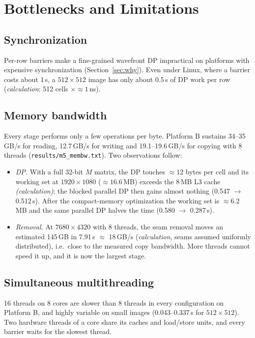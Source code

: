 \documentclass[11pt,a4paper]{article}
\newcommand{\us}{\,\textmu s}
\newcommand{\calc}{\emph{(calculation)}}
\begin{document}
\section{Bottlenecks and Limitations}
\label{sec:bottle}

\subsection{Synchronization}
Per-row barriers make a fine-grained wavefront DP impractical on platforms with expensive synchronization
(Section~\ref{sec:why}). Even under Linux, where a barrier costs about 1\us, a $512\times512$ image has only
about 0.5\us{} of DP work per row (\emph{calculation}: 512 cells $\times\approx1$\,ns).

\subsection{Memory bandwidth}
\label{sec:membw}
Every stage performs only a few operations per byte. Platform B sustains 34--35\,GB/s for reading,
12.7\,GB/s for writing and 19.1--19.6\,GB/s for copying with 8 threads (\texttt{results/m5\_membw.txt}).
Two observations follow:
\begin{itemize}
  \item \emph{DP.} With a full 32-bit $M$ matrix, the DP touches $\approx12$ bytes per cell and its working
    set at $1920\times1080$ ($\approx16.6$\,MB) exceeds the 8\,MB L3 cache \calc; the blocked parallel DP
    then gains almost nothing (0.547 $\to$ 0.512\,s). After the compact-memory optimization the working
    set is $\approx6.2$\,MB and the same parallel DP halves the time (0.580 $\to$ 0.287\,s).
  \item \emph{Removal.} At $7680\times4320$ with 8 threads, the seam removal moves an estimated 145\,GB in
    7.91\,s $\approx$ 18\,GB/s (\emph{calculation}, seams assumed uniformly distributed), i.e.\ close to the
    measured copy bandwidth. More threads cannot speed it up, and it is now the largest stage.
\end{itemize}

\subsection{Simultaneous multithreading}
16 threads on 8 cores are slower than 8 threads in every configuration on Platform B, and highly variable
on small images (0.043--0.337\,s for $512\times512$). Two hardware threads of a core share its caches and
load/store units, and every barrier waits for the slowest thread.
\end{document}
